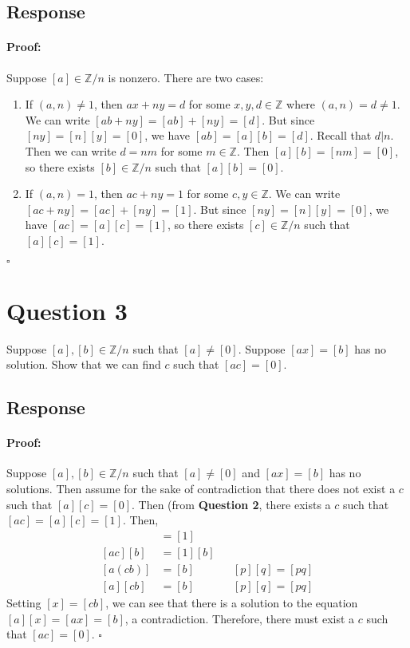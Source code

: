 \documentclass [12pt] {article}
\newcommand{\Z}{\mathbb{Z}}
\newenvironment{proof}{\paragraph{Proof:}}{\hfill$\square$}
\begin{document}
\subsection*{Response}
\begin{proof}
    Suppose $[a] \in \Z/n$ is nonzero. There are two cases:
    \begin{enumerate}[label=\it{Case \roman*:},leftmargin=*]
        \item If $(a, n) \neq 1$, then $ax + ny = d$ for some $x, y, d \in \Z$ where $(a, n) = d \neq 1$. 
            We can write $[ab + ny] = [ab] + [ny] = [d]$. But since $[ny] = [n][y] = [0]$, we have
            $[ab] = [a][b] = [d]$. Recall that $d | n$. Then we can write $d = nm$ for some 
            $m \in \Z$. Then $[a][b] = [nm] = [0]$, so there exists $[b] \in \Z/n$ such that
            $[a][b] = [0]$.
        \item If $(a, n) = 1$, then $ac + ny = 1$ for some $c, y \in \Z$. We can write
            $[ac + ny] = [ac] + [ny] = [1]$. But since $[ny] = [n][y] = [0]$, we have
            $[ac] = [a][c] = [1]$, so there exists $[c] \in \Z/n$ such that $[a][c] = [1]$.
    \end{enumerate}
\end{proof}
\newpage

\section*{Question 3}
Suppose $[a],[b]\in\Z/n$ such that $[a]\neq [0]$. Suppose $[ax]=[b]$ has no solution. Show that we 
can find $c$ such that $[ac]=[0]$. 

\subsection*{Response}
\begin{proof}
    Suppose $[a], [b] \in \Z/n$ such that $[a] \neq [0]$ and $[ax] = [b]$ has no solutions. Then
    assume for the sake of contradiction that there does not exist a $c$ such that $[a][c] = [0]$.
    Then (from \textbf{Question 2}, there exists a $c$ such that $[ac] = [a][c] = [1]$. Then,
    \begin{align*}
        [ac] &= [1] \\
        [ac][b] &= [1][b] \\
        [a(cb)] &= [b] && [p][q] = [pq] \\
        [a][cb] &= [b] && [p][q] = [pq]
    \end{align*}
    Setting $[x] = [cb]$, we can see that there is a solution to the equation $[a][x] = [ax] = [b]$, 
    a contradiction. Therefore, there must exist a $c$ such that $[ac] = [0]$.
\end{proof}
\newpage
\end{document}
